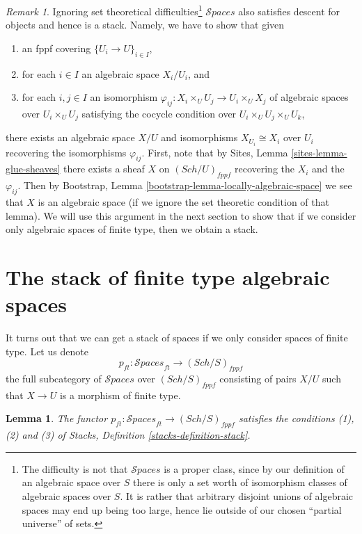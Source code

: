 \documentclass{stacks-project}
\theoremstyle{plain}
\newtheorem{lemma}[subsection]{Lemma}
\theoremstyle{definition}
\theoremstyle{remark}
\newtheorem{remark}[subsection]{Remark}
\numberwithin{equation}{subsection}
\def\Sch{\mathit{Sch}}
\def\Spacesstack{\mathcal{S}\!\mathit{paces}}
\begin{document}
\begin{remark}
\label{remark-stack-spaces}
Ignoring set theoretical difficulties\footnote{The difficulty is not
that $\Spacesstack$ is a proper class, since by our definition of
an algebraic space over $S$ there is only a set worth of isomorphism
classes of algebraic spaces over $S$. It is rather that arbitrary disjoint
unions of algebraic spaces may end up being too large, hence lie outside
of our chosen ``partial universe'' of sets.}
$\Spacesstack$ also satisfies
descent for objects and hence is a stack. Namely, we have to show that
given
\begin{enumerate}
\item an fppf covering $\{U_i \to U\}_{i \in I}$,
\item for each $i \in I$ an algebraic space $X_i/U_i$, and
\item for each $i, j \in I$ an isomorphism
$\varphi_{ij} : X_i \times_U U_j \to U_i \times_U X_j$ of algebraic spaces
over $U_i \times_U U_j$ satisfying the cocycle condition over
$U_i \times_U U_j \times_U U_k$,
\end{enumerate}
there exists an algebraic space $X/U$ and isomorphisms
$X_{U_i} \cong X_i$ over $U_i$ recovering the isomorphisms $\varphi_{ij}$.
First, note that by
Sites, Lemma \ref{sites-lemma-glue-sheaves}
there exists a sheaf $X$ on $(\Sch/U)_{fppf}$ recovering
the $X_i$ and the $\varphi_{ij}$. Then by
Bootstrap, Lemma \ref{bootstrap-lemma-locally-algebraic-space}
we see that $X$ is an algebraic space (if we ignore the set theoretic
condition of that lemma).
We will use this argument in the next section to show that
if we consider only algebraic spaces of finite type, then we obtain
a stack.
\end{remark}






\section{The stack of finite type algebraic spaces}
\label{section-stack-of-finite-type-spaces}


\noindent
It turns out that we can get a stack of spaces
if we only consider spaces of finite type.
Let us denote
$$
p_{ft} : \Spacesstack_{ft} \to (\Sch/S)_{fppf}
$$
the full subcategory of $\Spacesstack$ over $(\Sch/S)_{fppf}$
consisting of pairs $X/U$ such that $X \to U$
is a morphism of finite type.

\begin{lemma}
\label{lemma-stack-of-finite-type-spaces}
The functor
$p_{ft} : \Spacesstack_{ft} \to (\Sch/S)_{fppf}$
satisfies the conditions (1), (2) and (3) of
Stacks, Definition \ref{stacks-definition-stack}.
\end{lemma}
\end{document}
